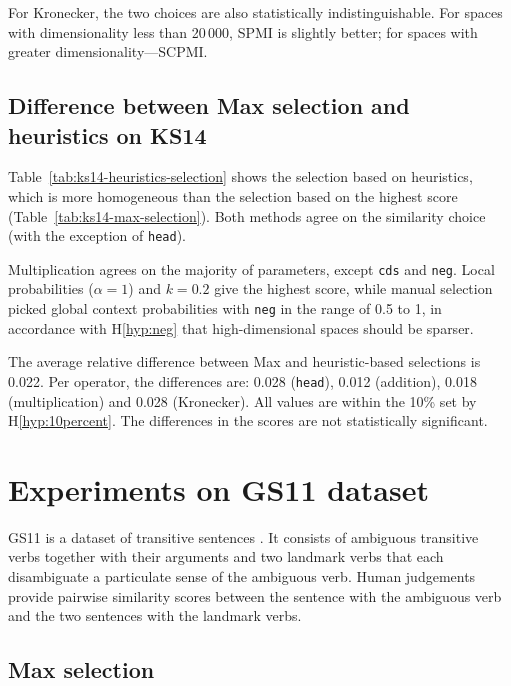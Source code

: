 For Kronecker, the two choices are also statistically indistinguishable. For spaces with dimensionality less than 20\,000, SPMI is slightly better; for spaces with greater dimensionality---SCPMI.

\subsection{Difference between Max selection and heuristics on KS14}

Table~\ref{tab:ks14-heuristics-selection} shows the selection based on heuristics, which is more homogeneous than the selection based on the highest score (Table~\ref{tab:ks14-max-selection}). Both methods agree on the similarity choice (with the exception of \texttt{head}).

Multiplication agrees on the majority of parameters, except \texttt{cds} and \texttt{neg}. Local probabilities ($\alpha = 1$) and $k = 0.2$ give the highest score, while manual selection picked global context probabilities with \texttt{neg} in the range of 0.5 to 1, in accordance with H\ref{hyp:neg} that high-dimensional spaces should be sparser.

The average relative difference between Max and heuristic-based selections is 0.022. Per operator, the differences are: 0.028 (\texttt{head}), 0.012 (addition), 0.018 (multiplication) and 0.028 (Kronecker). All values are within the 10\% set by H\ref{hyp:10percent}. The differences in the scores are not statistically significant.

\section{Experiments on GS11 dataset}
\label{sec:gs11}

GS11 is a dataset of transitive sentences \cite{Grefenstette:2011:ESC:2145432.2145580,Grefenstette:2011:ETV:2140490.2140497}. It consists of ambiguous transitive verbs together with their arguments and two landmark verbs that each disambiguate a particulate sense of the ambiguous verb. Human judgements provide pairwise similarity scores between the sentence with the ambiguous verb and the two sentences with the landmark verbs.

\subsection{Max selection}
\label{sec:max-selection-gs11}



